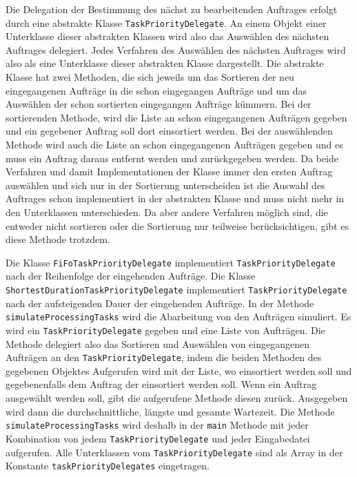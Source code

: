 \documentclass[a4paper,10pt,ngerman]{scrartcl}
\begin{document}
	      Die Delegation der Bestimmung des nächst zu bearbeitenden Auftrages erfolgt
	      durch eine abstrakte Klasse \texttt{TaskPriorityDelegate}.
	      An einem Objekt einer Unterklasse dieser abstrakten Klassen wird
	      also das Auswählen des nächsten Auftrages delegiert.
	      Jedes Verfahren des Auswählen des nächsten Auftrages wird
	      also als eine Unterklasse dieser abstrakten Klasse dargestellt.
	Die abstrakte Klasse hat zwei Methoden, die sich jeweils um das Sortieren
	      der neu eingegangenen Aufträge in die schon eingegangen Aufträge
	      und um das Auswählen der schon sortierten eingegangen Aufträge kümmern.
	      Bei der sortierenden Methode, wird die Liste an schon eingegangenen Aufträgen gegeben
	      und ein gegebener Auftrag soll dort einsortiert werden.
	      Bei der auswählenden Methode wird auch die Liste an schon eingegangenen Aufträgen gegeben
	      und es muss ein Auftrag daraus entfernt werden und zurückgegeben werden.
	Da beide Verfahren und damit Implementationen der Klasse immer den ersten Auftrag auswählen
	      und sich nur in der Sortierung unterscheiden ist die Auswahl des Auftrages schon implementiert in der abstrakten Klasse
	      und muss nicht mehr in den Unterklassen unterschieden. Da aber andere Verfahren möglich sind,
	      die entweder nicht sortieren oder die Sortierung nur teilweise berücksichtigen, gibt es diese Methode trotzdem.
	      
	      Die Klasse \texttt{FiFoTaskPriorityDelegate} implementiert \texttt{TaskPriorityDelegate}
	      nach der Reihenfolge der eingehenden Aufträge.
	Die Klasse \texttt{ShortestDurationTaskPriorityDelegate} implementiert \texttt{TaskPriorityDelegate}
	      nach der aufsteigenden Dauer der eingehenden Aufträge.
	In der Methode \texttt{simulateProcessingTasks} wird die Abarbeitung von den Aufträgen simuliert.
	      Es wird ein \texttt{TaskPriorityDelegate} gegeben und eine Liste von Aufträgen.
	      Die Methode delegiert also das Sortieren und Auswählen von eingegangenen Aufträgen
	      an den \texttt{TaskPriorityDelegate},
	      indem die beiden Methoden des gegebenen Objektes Aufgerufen wird
	      mit der Liste, wo einsortiert werden soll
	      und gegebenenfalls dem Auftrag der einsortiert werden soll.
	      Wenn ein Auftrag ausgewählt werden soll, gibt die aufgerufene Methode diesen zurück.
	      Ausgegeben wird dann die durchschnittliche, längste und gesamte Wartezeit.
	Die Methode \texttt{simulateProcessingTasks} wird deshalb in der \texttt{main} Methode
	      mit jeder Kombination von jedem \texttt{TaskPriorityDelegate} und jeder Eingabedatei aufgerufen.
	      Alle Unterklassen vom \texttt{TaskPriorityDelegate} sind als Array
	      in der Konstante \texttt{taskPriorityDelegates} eingetragen.
\end{document}
